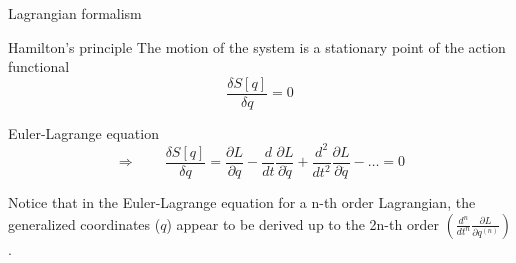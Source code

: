 \begin{frame}{Lagrangian formalism}
  \begin{alertblock}{Hamilton's principle}
    \vspace{0.5em}
    The motion of the system is a stationary point of the action
    functional~\cite{Goldstein11_Ham_principle}
    \begin{equation*}
      \frac{\delta S[q]}{\delta q} = 0
    \end{equation*}
  \end{alertblock}
  \begin{alertblock}{Euler-Lagrange equation}
    \vspace{0.5em}
    \begin{equation*}
      \Rightarrow \qquad
      \frac{\delta S[q]}{\delta q} =
      \frac{\partial L}{\partial q} -
      \frac{d}{dt}\frac{\partial L}{\partial \dot{q}} +
      \frac{d^2}{dt^2}\frac{\partial L}{\partial \ddot{q}} -
      \ldots = 0
    \end{equation*}

    Notice that in the Euler-Lagrange equation for a n-th order Lagrangian, the
    generalized coordinates ($q$) appear to be derived up to the 2n-th order
    $\left(\frac{d^n}{dt^n} \frac{\partial L}{\partial q^{(n)}}\right)$.
  \end{alertblock}
\end{frame}

